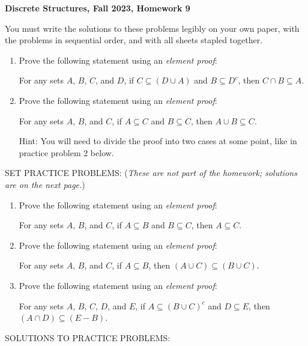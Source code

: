 \documentclass[11pt, letterpaper]{report}
\begin{document}
\textbf{Discrete Structures, Fall 2023, Homework 9}

\bigskip

You must write the solutions to these problems legibly on your own paper, with
the problems in sequential order, and with all sheets stapled together.

\begin{enumerate}

	\item Prove the following statement using an \textit{element proof}:
	
	For any sets $A$, $B$, $C$, and $D$, if $C \subseteq (D \cup A)$ and $B \subseteq D^c$, then
	$C \cap B \subseteq A$.
	
	\item Prove the following statement using an \textit{element proof}:
	
	For any sets $A$, $B$, and $C$, if $A \subseteq C$ and $B \subseteq C$, then
	$A \cup B \subseteq C$.
	
	Hint: You will need to divide the proof into two cases at some point, like in practice problem 2 below.
	
\end{enumerate}

SET PRACTICE PROBLEMS: (\textit{These are not part of the homework; solutions are on the next page.})

\begin{enumerate}

	\item Prove the following statement using an \textit{element proof}:
	
	For any sets $A$, $B$, and $C$, if $A \subseteq B$ and $B \subseteq C$, then
	$A \subseteq C$.
	
	\item Prove the following statement using an \textit{element proof}:
	
	For any sets $A$, $B$, and $C$, if $A \subseteq B$, then
	$(A \cup C) \subseteq (B \cup C)$.
	
	\item Prove the following statement using an \textit{element proof}:
	
	For any sets $A$, $B$, $C$, $D$, and $E$, if $A \subseteq (B \cup C)^c$ and $D \subseteq E$, then
	$(A \cap D) \subseteq (E-B)$.
	
\end{enumerate}


\newpage
SOLUTIONS TO PRACTICE PROBLEMS:
\end{document}
